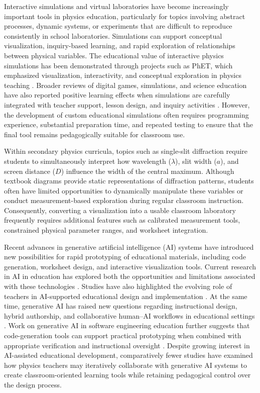 \documentclass{iopjournal}
\begin{document}
Interactive simulations and virtual laboratories have become increasingly important tools in physics education, particularly for topics involving abstract processes, dynamic systems, or experiments that are difficult to reproduce consistently in school laboratories. Simulations can support conceptual visualization, inquiry-based learning, and rapid exploration of relationships between physical variables. The educational value of interactive physics simulations has been demonstrated through projects such as PhET, which emphasized visualization, interactivity, and conceptual exploration in physics teaching \cite{finkelstein2006,wieman2010}. Broader reviews of digital games, simulations, and science education have also reported positive learning effects when simulations are carefully integrated with teacher support, lesson design, and inquiry activities \cite{clark2015,rutten2012,smetana2012,banda2021}. However, the development of custom educational simulations often requires programming experience, substantial preparation time, and repeated testing to ensure that the final tool remains pedagogically suitable for classroom use.

Within secondary physics curricula, topics such as single-slit diffraction require students to simultaneously interpret how wavelength ($\lambda$), slit width ($a$), and screen distance ($D$) influence the width of the central maximum. Although textbook diagrams provide static representations of diffraction patterns, students often have limited opportunities to dynamically manipulate these variables or conduct measurement-based exploration during regular classroom instruction. Consequently, converting a visualization into a usable classroom laboratory frequently requires additional features such as calibrated measurement tools, constrained physical parameter ranges, and worksheet integration.

Recent advances in generative artificial intelligence (AI) systems have introduced new possibilities for rapid prototyping of educational materials, including code generation, worksheet design, and interactive visualization tools. Current research in AI in education has explored both the opportunities and limitations associated with these technologies \cite{holmes2022,baidoo2025}. Studies have also highlighted the evolving role of teachers in AI-supported educational design and implementation \cite{celik2022}. At the same time, generative AI has raised new questions regarding instructional design, hybrid authorship, and collaborative human--AI workflows in educational settings \cite{hodges2024}. Work on generative AI in software engineering education further suggests that code-generation tools can support practical prototyping when combined with appropriate verification and instructional oversight \cite{li2024}. Despite growing interest in AI-assisted educational development, comparatively fewer studies have examined how physics teachers may iteratively collaborate with generative AI systems to create classroom-oriented learning tools while retaining pedagogical control over the design process.
\end{document}
